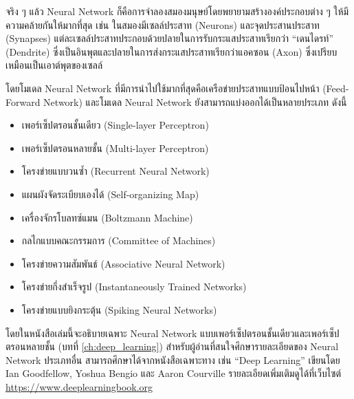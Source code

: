 จริง ๆ แล้ว Neural Network ก็คือการจำลองสมองมนุษย์โดยพยายามสร้างองค์ประกอบต่าง ๆ ให้มีความคล้ายกันให้มากที่สุด เช่น ในสมองมีเซลล์ประสาท (Neurons) และจุดประสานประสาท (Synapses) แต่ละเซลล์ประสาทประกอบด้วยปลายในการรับกระแสประสาทเรียกว่า \enquote{เดนไดรท์} (Dendrite) ซึ่งเป็นอินพุตและปลายในการส่งกระแสประสาทเรียกว่าแอคซอน (Axon) ซึ่งเปรียบเหมือนเป็นเอาต์พุตของเซลล์

โดยโมเดล Neural Network ที่มีการนำไปใช้มากที่สุดคือเครือข่ายประสาทแบบป้อนไปหน้า (Feed-Forward Network) และโมเดล Neural Network ยังสามารถแบ่งออกได้เป็นหลายประเภท ดังนี้
%
\begin{itemize}[topsep=0pt,noitemsep]\setlength\itemsep{0.5em}
    \item เพอร์เซ็ปตรอนชั้นเดียว (Single-layer Perceptron)

    \item เพอร์เซ็ปตรอนหลายชั้น (Multi-layer Perceptron)

    \item โครงข่ายแบบวนซ้ำ (Recurrent Neural Network)

    \item แผนผังจัดระเบียบเองได้ (Self-organizing Map)

    \item เครื่องจักรโบลทซ์แมน (Boltzmann Machine)

    \item กลไกแบบคณะกรรมการ (Committee of Machines)

    \item โครงข่ายความสัมพันธ์ (Associative Neural Network)

    \item โครงข่ายกึ่งสำเร็จรูป (Instantaneously Trained Networks)

    \item โครงข่ายแบบยิงกระตุ้น (Spiking Neural Networks)
\end{itemize}

โดยในหนังสือเล่มนี้จะอธิบายเฉพาะ Neural Network แบบเพอร์เซ็ปตรอนชั้นเดียวและเพอร์เซ็ปตรอนหลายชั้น (บทที่ \ref{ch:deep_learning}) สำหรับผู้อ่านที่สนใจศึกษารายละเอียดของ Neural Network ประเภทอื่น สามารถศึกษาได้จากหนังสือเฉพาะทาง เช่น \enquote{Deep Learning} เขียนโดย Ian Goodfellow, Yoshua Bengio และ Aaron Courville\autocite{Goodfellow-et-al-2016} รายละเอียดเพิ่มเติมดูได้ที่เว็บไซต์ \url{https://www.deeplearningbook.org}
